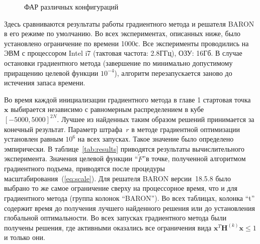 \begin{figure}
    \begin{minipage}[h]{0.49\linewidth}
    \end{minipage}
    \hfill
    \begin{minipage}[h]{0.49\linewidth}
    \end{minipage}
    \begin{minipage}[h]{0.49\linewidth}
    \end{minipage}
    \hfill
    \begin{minipage}[h]{0.49\linewidth}
    \end{minipage}
    \caption{ФАР различных конфигураций}
    \label{ris:paas}
\end{figure}

Здесь сравниваются результаты работы градиентного метода и решателя BARON в его режиме по умолчанию. Во всех экспериментах, описанных ниже, было установлено ограничение по времени 1000с. Все эксперименты проводились на ЭВМ с процессором Intel i7 (тактовая частота: 2.8ГГц), ОЗУ: 16Гб. В случае остановки градиентного метода (завершение по минимально допустимому приращению целевой функции $10^{-4}$), алгоритм перезапускается заново до истечения запаса времени.

Во время каждой инициализации градиентного метода в главе 1 стартовая точка~$\textbf{x}$ выбирается независимо с равномерным распределением в кубе $[-5000, 5000]^{2N}$. Лучшее из найденных таким образом решений принимается за конечный результат. Параметр штрафа~$r$ в методе градиентной оптимизации установлен равным $10^6$ на всех запусках. Такое значение было определено эмпирически. В таблице~\ref{tab:results} приводятся результаты вычислительного эксперимента. Значения целевой функции ``$\tilde{F}$''в точке, полученной алгоритмом градиентного подъема, приводятся после процедуры масштабирования~(\ref{eq:scale}). Для решателя BARON версии~18.5.8 было выбрано то же самое ограничение сверху на процессорное время, что и для градиентного метода (группа колонок ``BARON''). Во всех таблицах, колонка ``t'' содержит время до получения лучшего найденного решения или до установления глобальной оптимальности. Во всех запусках градиентного метода были получены решения, где активными оказались все ограничения вида $\textbf{x}^{T}\textbf{H}^{(k)}\textbf{x} \leq 1$ и только они.


